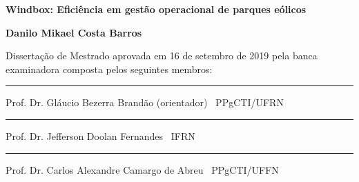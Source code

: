 %
%

\begin{titlepage}

\begin{center}

\LARGE

\textbf{Windbox: Eficiência em gestão operacional de parques eólicos}

\vfill

\Large

\textbf{Danilo Mikael Costa Barros}

\end{center}

\vfill

\noindent
Dissertação de Mestrado
aprovada em 16 de setembro de 2019 pela banca examinadora composta
pelos seguintes membros:


\begin{center}

\vspace{1.5cm}\rule{0.95\linewidth}{1pt}
\parbox{0.9\linewidth}{%
Prof. Dr. Gláucio Bezerra Brandão (orientador) \dotfill\ PPgCTI/UFRN}

\vspace{1.5cm}\rule{0.95\linewidth}{1pt}
\parbox{0.9\linewidth}{%
Prof. Dr. Jefferson Doolan Fernandes \dotfill\ IFRN}

\vspace{1.5cm}\rule{0.95\linewidth}{1pt}
\parbox{0.9\linewidth}{%
Prof. Dr. Carlos Alexandre Camargo de Abreu \dotfill\ PPgCTI/UFFN}

\end{center}

\end{titlepage}

%
%


